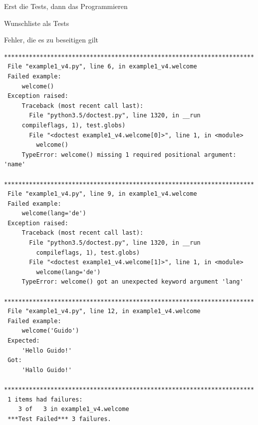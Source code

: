 \documentclass[t, utf8x, 10pt]{beamer}
\begin{document}
\begin{frame}[c]{Erst die Tests, dann das Programmieren}
 \begin{center}
  \begin{Large}
   \setlength{}	  
  \end{Large}
 \end{center}
\end{frame}


\begin{frame}{Wunschliste als Tests}
 
\end{frame}


\begin{frame}[fragile]{Fehler, die es zu beseitigen gilt}
 \begin{tiny}
	 \begin{lstlisting}[language={}]
 **********************************************************************
 File "example1_v4.py", line 6, in example1_v4.welcome
 Failed example:
     welcome()
 Exception raised:
     Traceback (most recent call last):
       File "python3.5/doctest.py", line 1320, in __run
	 compileflags, 1), test.globs)
       File "<doctest example1_v4.welcome[0]>", line 1, in <module>
         welcome()
     TypeError: welcome() missing 1 required positional argument: 'name'
 **********************************************************************
 File "example1_v4.py", line 9, in example1_v4.welcome
 Failed example:
     welcome(lang='de')
 Exception raised:
     Traceback (most recent call last):
       File "python3.5/doctest.py", line 1320, in __run
         compileflags, 1), test.globs)
       File "<doctest example1_v4.welcome[1]>", line 1, in <module>
         welcome(lang='de')
     TypeError: welcome() got an unexpected keyword argument 'lang'
 **********************************************************************
 File "example1_v4.py", line 12, in example1_v4.welcome
 Failed example:
     welcome('Guido')
 Expected:
     'Hello Guido!'
 Got:
     'Hallo Guido!'
 **********************************************************************
 1 items had failures:
    3 of   3 in example1_v4.welcome
 ***Test Failed*** 3 failures.
  \end{lstlisting}
 \end{tiny}
\end{frame}
\end{document}

